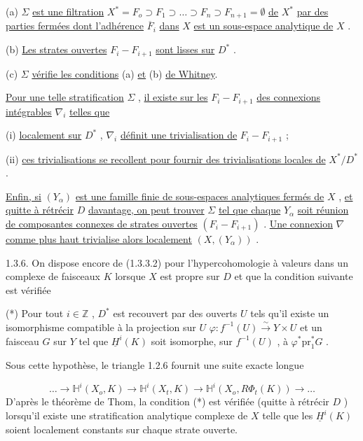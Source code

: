 (a) $\Sigma$ \underline{est une filtration} $X^* = F_o \supset F_1 \supset \ldots \supset F_n \supset F_{n+1} = \emptyset$ \underline{de} $X^*$ \underline{par des parties fermées dont l'adhérence} $\overline{F}_i$ \underline{dans} $X$ \underline{est un sous-espace analytique de} $X$ .



(b) \underline{Les strates ouvertes} $F_i - F_{i+1}$ \underline{sont lisses sur} $D^*$ .

(c) $\Sigma$ \underline{vérifie les conditions} (a) \underline{et} (b) \underline{de Whitney}.

\underline{Pour une telle stratification} $\Sigma$ , \underline{il existe sur les} $F_i - F_{i+1}$ \underline{des connexions intégrables} $\nabla_i$ \underline{telles que}

(i) \underline{localement sur} $D^*$ , $\nabla_i$ \underline{définit une trivialisation de} $F_i - F_{i+1}$ ;

(ii) \underline{ces trivialisations se recollent pour fournir des trivialisations locales de} $X^*/D^*$ .

\underline{Enfin, si} $(Y_\alpha)$ \underline{est une famille finie de sous-espaces analytiques fermés de} $X$ , \underline{et quitte à rétrécir} $D$ \underline{davantage, on peut trouver} $\Sigma$ \underline{tel que chaque} $Y_\alpha$ \underline{soit réunion de composantes connexes de strates ouvertes} $(F_i - F_{i+1})$ . \underline{Une connexion} $\nabla$ \underline{comme plus haut trivialise alors localement} $(X, (Y_\alpha))$ .

1.3.6. On dispose encore de (1.3.3.2) pour l'hypercohomologie à valeurs dans un complexe de faisceaux $K$ lorsque $X$ est propre sur $D$ et que la condition suivante est vérifiée

(*) Pour tout $i \in \mathbb{Z}$ , $D^*$ est recouvert par des ouverts $U$ tels qu'il existe un isomorphisme compatible à la projection sur $U$ $\varphi : f^{-1}(U) \xrightarrow{\sim} Y \times U$ et un faisceau $G$ sur $Y$ tel que $\underline{H}^i(K)$ soit isomorphe, sur $f^{-1}(U)$ , à $\varphi^* \mathrm{pr}_1^* G$ .

Sous cette hypothèse, le triangle 1.2.6 fournit une suite exacte longue

\begin{equation}\tag{1.3.6.1}
\ldots \longrightarrow \mathbb{H}^i(X_o, K) \longrightarrow \mathbb{H}^i(X_t, K) \longrightarrow \mathbb{H}^i(X_o, R\Phi_t(K)) \longrightarrow \ldots
\end{equation}
D'après le théorème de Thom, la condition (*) est vérifiée (quitte à rétrécir $D$ ) lorsqu'il existe une stratification analytique complexe de $X$ telle que les $\underline{H}^i(K)$ soient localement constants sur chaque strate ouverte.


